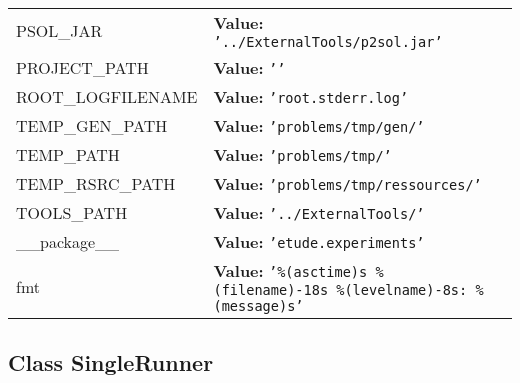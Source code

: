 \begin{longtable}{|p{\varnamewidth}|p{\vardescrwidth}|l}
\cline{1-2}
\raggedright P\-2\-S\-O\-L\-\_\-J\-A\-R\- & \raggedright \textbf{Value:} 
{\tt \texttt{'}\texttt{../ExternalTools/p2sol.jar}\texttt{'}}&\\
\cline{1-2}
\raggedright P\-R\-O\-J\-E\-C\-T\-\_\-P\-A\-T\-H\- & \raggedright \textbf{Value:} 
{\tt \texttt{'}\texttt{}\texttt{'}}&\\
\cline{1-2}
\raggedright R\-O\-O\-T\-\_\-L\-O\-G\-F\-I\-L\-E\-N\-A\-M\-E\- & \raggedright \textbf{Value:} 
{\tt \texttt{'}\texttt{root.stderr.log}\texttt{'}}&\\
\cline{1-2}
\raggedright T\-E\-M\-P\-\_\-G\-E\-N\-\_\-P\-A\-T\-H\- & \raggedright \textbf{Value:} 
{\tt \texttt{'}\texttt{problems/tmp/gen/}\texttt{'}}&\\
\cline{1-2}
\raggedright T\-E\-M\-P\-\_\-P\-A\-T\-H\- & \raggedright \textbf{Value:} 
{\tt \texttt{'}\texttt{problems/tmp/}\texttt{'}}&\\
\cline{1-2}
\raggedright T\-E\-M\-P\-\_\-R\-S\-R\-C\-\_\-P\-A\-T\-H\- & \raggedright \textbf{Value:} 
{\tt \texttt{'}\texttt{problems/tmp/ressources/}\texttt{'}}&\\
\cline{1-2}
\raggedright T\-O\-O\-L\-S\-\_\-P\-A\-T\-H\- & \raggedright \textbf{Value:} 
{\tt \texttt{'}\texttt{../ExternalTools/}\texttt{'}}&\\
\cline{1-2}
\raggedright \_\-\_\-p\-a\-c\-k\-a\-g\-e\-\_\-\_\- & \raggedright \textbf{Value:} 
{\tt \texttt{'}\texttt{etude.experiments}\texttt{'}}&\\
\cline{1-2}
\raggedright f\-m\-t\- & \raggedright \textbf{Value:} 
{\tt \texttt{'}\texttt{\%(asctime)s \%(filename)-18s \%(levelname)-8s: \%(message)s}\texttt{'}}&\\
\cline{1-2}
\end{longtable}



\subsection{Class SingleRunner}

